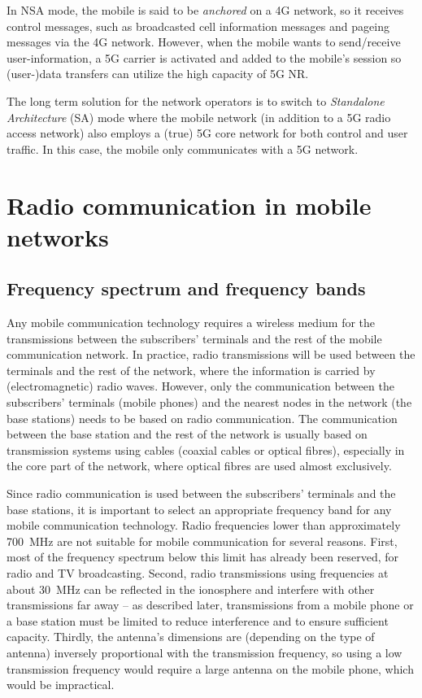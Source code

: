 In NSA mode, the mobile is said to be \emph{anchored} on a 4G network, so it receives control messages, such as broadcasted cell information messages and pageing messages via the 4G network. However, when the mobile wants to send/receive user-information, a 5G carrier is activated and added to the mobile's session so (user-)data transfers can utilize the high capacity of 5G NR.

The long term solution for the network operators is to switch to \emph{Standalone Architecture} (SA) mode where the mobile network (in addition to a 5G radio access network) also employs a (true) 5G core network for both control and user traffic. In this case, the mobile only communicates with a 5G network.

\chapter{Radio communication in mobile networks}

\section{Frequency spectrum and frequency bands}
Any mobile communication technology requires a wireless medium for the transmissions between the subscribers' terminals and the rest of the mobile communication network. In practice, radio transmissions will be used between the terminals and the rest of the network, \ie where the information is carried by (electromagnetic) radio waves. However, only the communication between the subscribers' terminals (\ie mobile phones) and the nearest nodes in the network (\ie the base stations) needs to be based on radio communication. The communication between the base station and the rest of the network is usually based on transmission systems using cables (coaxial cables or optical fibres), especially in the core part of the network, where optical fibres are used almost exclusively.

Since radio communication is used between the subscribers' terminals and the base stations, it is important to select an appropriate frequency band for any mobile communication technology. Radio frequencies lower than approximately 700~MHz are not suitable for mobile communication for several reasons. First, most of the frequency spectrum below this limit has already been reserved, \eg for radio and TV broadcasting. Second, radio transmissions using frequencies at about 30~MHz can be reflected in the ionosphere and interfere with other transmissions far away -- as described later, transmissions from a mobile phone or a base station must be limited to reduce interference and to ensure sufficient capacity. Thirdly, the antenna's dimensions are (depending on the type of antenna) inversely proportional with the transmission frequency, so using a low transmission frequency would require a large antenna on the mobile phone, which would be impractical. 

